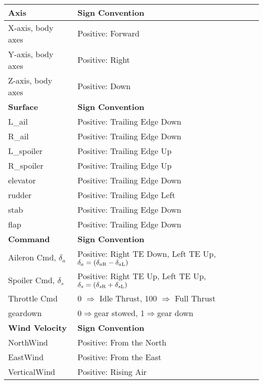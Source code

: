 \documentclass[12pt]{article}
\begin{document}
\begin{center}
\ 
\vfill
\begin{tabular}{|l|l|}
\hline
{\bf Axis} & {\bf Sign Convention} \\
\hline
X-axis, body axes     & Positive: Forward \\
Y-axis, body axes     & Positive: Right \\
Z-axis, body axes     & Positive: Down\\
\hline
{\bf Surface} & {\bf Sign Convention} \\
\hline
L\_ail            &  Positive: Trailing Edge Down\\
R\_ail		  &  Positive: Trailing Edge Down\\
L\_spoiler	  &  Positive: Trailing Edge Up\\
R\_spoiler	  &  Positive: Trailing Edge Up\\
elevator	  &  Positive: Trailing Edge Down\\
rudder		  &  Positive: Trailing Edge Left\\
stab		  &  Positive: Trailing Edge Down \\
flap		  &  Positive: Trailing Edge Down \\
\hline
{\bf Command} & {\bf Sign Convention} \\
\hline
Aileron Cmd, $\delta_a$ &  Positive: Right TE Down, Left TE Up, $\delta_a=(\delta_{a{\rm R}} - \delta_{a{\rm L}})$ \\
Spoiler Cmd, $\delta_s$ &  Positive: Right TE  Up, Left TE Up, $\delta_s=(\delta_{s{\rm R}} + \delta_{s{\rm L}})$ \\
Throttle Cmd & 0 $\Rightarrow$ Idle Thrust, 100 $\Rightarrow$ Full Thrust\\ 
geardown	  &  0$\Rightarrow$gear stowed, 1$\Rightarrow$gear down\\
\hline
{\bf Wind Velocity}  & {\bf Sign Convention} \\
\hline
NorthWind    & Positive: From the North\\
EastWind     & Positive: From the East\\
VerticalWind & Positive: Rising Air\\
\hline
\end{tabular}
\vfill
\end{center}
\end{document}
